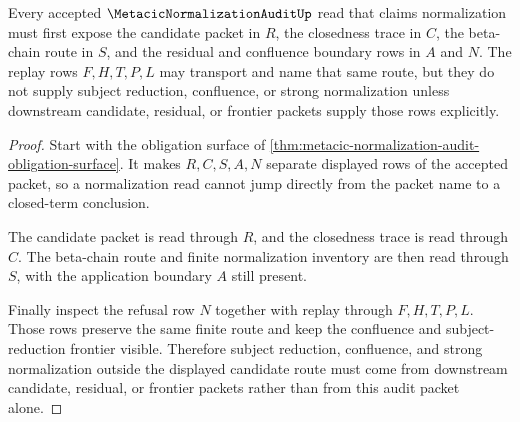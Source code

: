 \begin{theorem}
\label{thm:metacic-normalization-audit-candidate-boundary}
Every accepted $\MetacicNormalizationAuditUp$ read that claims normalization must first expose the candidate packet in $R$, the closedness trace in $C$, the beta-chain route in $S$, and the residual and confluence boundary rows in $A$ and $N$. The replay rows $F,H,T,P,L$ may transport and name that same route, but they do not supply subject reduction, confluence, or strong normalization unless downstream candidate, residual, or frontier packets supply those rows explicitly.
\end{theorem}
\begin{proof}
Start with the obligation surface of \autoref{thm:metacic-normalization-audit-obligation-surface}. It makes $R,C,S,A,N$ separate displayed rows of the accepted packet, so a normalization read cannot jump directly from the packet name to a closed-term conclusion.

The candidate packet is read through $R$, and the closedness trace is read through $C$. The beta-chain route and finite normalization inventory are then read through $S$, with the application boundary $A$ still present.

Finally inspect the refusal row $N$ together with replay through $F,H,T,P,L$. Those rows preserve the same finite route and keep the confluence and subject-reduction frontier visible. Therefore subject reduction, confluence, and strong normalization outside the displayed candidate route must come from downstream candidate, residual, or frontier packets rather than from this audit packet alone.
\end{proof}

